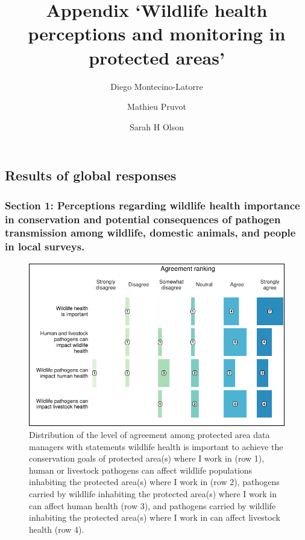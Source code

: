 \documentclass[
  letterpaper,
  DIV=11,
  numbers=noendperiod]{scrartcl}
\title{Appendix `Wildlife health perceptions and monitoring in protected
areas'}
\author{Diego Montecino-Latorre \and Mathieu Pruvot \and Sarah H Olson}
\date{}
\begin{document}
\maketitle
\ifdefined\Shaded\renewenvironment{Shaded}{\begin{tcolorbox}[enhanced, borderline west={3pt}{0pt}{shadecolor}, interior hidden, frame hidden, boxrule=0pt, breakable, sharp corners]}{\end{tcolorbox}}\fi

\hypertarget{results-of-global-responses}{%
\subsection{Results of global
responses}\label{results-of-global-responses}}

\hypertarget{section-1-perceptions-regarding-wildlife-health-importance-in-conservation-and-potential-consequences-of-pathogen-transmission-among-wildlife-domestic-animals-and-people-in-local-surveys.}{%
\subsubsection{Section 1: Perceptions regarding wildlife health
importance in conservation and potential consequences of pathogen
transmission among wildlife, domestic animals, and people in local
surveys.}\label{section-1-perceptions-regarding-wildlife-health-importance-in-conservation-and-potential-consequences-of-pathogen-transmission-among-wildlife-domestic-animals-and-people-in-local-surveys.}}

\begin{figure}[H]

{\centering \includegraphics{Appendix_final_files/figure-pdf/section 1 plot-1.pdf}

}

\caption{Distribution of the level of agreement among protected area
data managers with statements wildlife health is important to achieve
the conservation goals of protected area(s) where I work in (row 1),
human or livestock pathogens can affect wildlife populations inhabiting
the protected area(s) where I work in (row 2), pathogens carried by
wildlife inhabiting the protected area(s) where I work in can affect
human health (row 3), and pathogens carried by wildlife inhabiting the
protected area(s) where I work in can affect livestock health (row 4).}

\end{figure}
\end{document}
